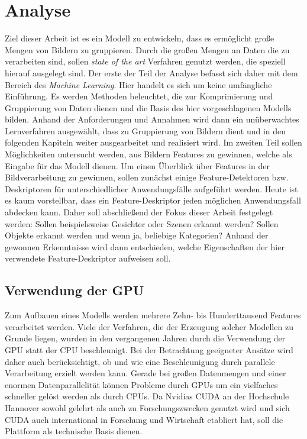 \chapter{Analyse}

Ziel dieser Arbeit ist es ein Modell zu entwickeln, dass es ermöglicht große Mengen von Bildern zu gruppieren. Durch die großen Mengen an Daten die zu verarbeiten sind, sollen \textit{state of the art} Verfahren genutzt werden, die speziell hierauf ausgelegt sind. Der erste der Teil der Analyse befasst sich daher mit dem Bereich des \textit{Machine Learning}. Hier handelt es sich um keine umfängliche Einführung. Es werden Methoden beleuchtet, die zur Komprimierung und Gruppierung von Daten dienen und die Basis des hier vorgeschlagenen Modells bilden. Anhand der Anforderungen und Annahmen wird dann ein unüberwachtes Lernverfahren ausgewählt, dass zu Gruppierung von Bildern dient und in den folgenden Kapiteln weiter ausgearbeitet und realisiert wird. \newline
Im zweiten Teil sollen Möglichkeiten untersucht werden, aus Bildern Features zu gewinnen, welche als Eingabe für das Modell dienen. Um einen Überblick über Features in der Bildverarbeitung zu gewinnen, sollen zunächst einige Feature-Detektoren bzw. Deskriptoren für unterschiedlicher Anwendungsfälle aufgeführt werden. Heute ist es kaum vorstellbar, dass ein Feature-Deskriptor jeden möglichen Anwendungsfall abdecken kann. Daher soll abschließend der Fokus dieser Arbeit festgelegt werden: Sollen beispielsweise Gesichter oder Szenen erkannt werden? Sollen Objekte erkannt werden und wenn ja, beliebige Kategorien? Anhand der gewonnen Erkenntnisse wird dann entschieden, welche Eigenschaften der hier verwendete Feature-Deskriptor aufweisen soll. 


\section{Verwendung der GPU}

Zum Aufbauen eines Modells werden mehrere Zehn- bis Hunderttausend Features verarbeitet werden. Viele der Verfahren, die der Erzeugung solcher Modellen zu Grunde liegen, wurden in den vergangenen Jahren durch die Verwendung der GPU statt der CPU beschleunigt. Bei der Betrachtung geeigneter Ansätze wird daher auch berücksichtigt, ob und wie eine Beschleunigung durch parallele Verarbeitung erzielt werden kann. Gerade bei großen Datenmengen und einer enormen Datenparallelität können Probleme durch GPUs um ein vielfaches schneller gelöst werden als durch CPUs. Da Nvidias CUDA an der Hochschule Hannover sowohl gelehrt als auch zu Forschungszwecken genutzt wird und sich CUDA auch international in Forschung und Wirtschaft etabliert hat, soll die Plattform als technische Basis dienen. 

